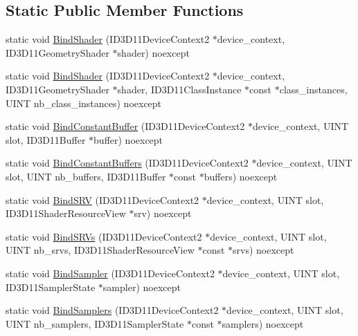 \subsection*{Static Public Member Functions}
\begin{DoxyCompactItemize}
\item 
static void \hyperlink{structmage_1_1_g_s_a60550a57e2dcdf7faf911b8222c70fe4}{Bind\+Shader} (I\+D3\+D11\+Device\+Context2 $\ast$device\+\_\+context, I\+D3\+D11\+Geometry\+Shader $\ast$shader) noexcept
\item 
static void \hyperlink{structmage_1_1_g_s_ab8052f3aabdeb8216144583b0d3163f5}{Bind\+Shader} (I\+D3\+D11\+Device\+Context2 $\ast$device\+\_\+context, I\+D3\+D11\+Geometry\+Shader $\ast$shader, I\+D3\+D11\+Class\+Instance $\ast$const $\ast$class\+\_\+instances, U\+I\+NT nb\+\_\+class\+\_\+instances) noexcept
\item 
static void \hyperlink{structmage_1_1_g_s_a659dc45c958591ec1187e95aec96671d}{Bind\+Constant\+Buffer} (I\+D3\+D11\+Device\+Context2 $\ast$device\+\_\+context, U\+I\+NT slot, I\+D3\+D11\+Buffer $\ast$buffer) noexcept
\item 
static void \hyperlink{structmage_1_1_g_s_a82ffcec2cd3c6608e11721d3e2d6c930}{Bind\+Constant\+Buffers} (I\+D3\+D11\+Device\+Context2 $\ast$device\+\_\+context, U\+I\+NT slot, U\+I\+NT nb\+\_\+buffers, I\+D3\+D11\+Buffer $\ast$const $\ast$buffers) noexcept
\item 
static void \hyperlink{structmage_1_1_g_s_ac7271ceaa8db061077936fc0014f14f2}{Bind\+S\+RV} (I\+D3\+D11\+Device\+Context2 $\ast$device\+\_\+context, U\+I\+NT slot, I\+D3\+D11\+Shader\+Resource\+View $\ast$srv) noexcept
\item 
static void \hyperlink{structmage_1_1_g_s_ac90532397c256ae791a834cd819a45f0}{Bind\+S\+R\+Vs} (I\+D3\+D11\+Device\+Context2 $\ast$device\+\_\+context, U\+I\+NT slot, U\+I\+NT nb\+\_\+srvs, I\+D3\+D11\+Shader\+Resource\+View $\ast$const $\ast$srvs) noexcept
\item 
static void \hyperlink{structmage_1_1_g_s_a4fe7586c7f4d43b5ef102f7db92f4816}{Bind\+Sampler} (I\+D3\+D11\+Device\+Context2 $\ast$device\+\_\+context, U\+I\+NT slot, I\+D3\+D11\+Sampler\+State $\ast$sampler) noexcept
\item 
static void \hyperlink{structmage_1_1_g_s_ac7d13923e7cfe5faf036dfb0e611d4e2}{Bind\+Samplers} (I\+D3\+D11\+Device\+Context2 $\ast$device\+\_\+context, U\+I\+NT slot, U\+I\+NT nb\+\_\+samplers, I\+D3\+D11\+Sampler\+State $\ast$const $\ast$samplers) noexcept
\end{DoxyCompactItemize}
